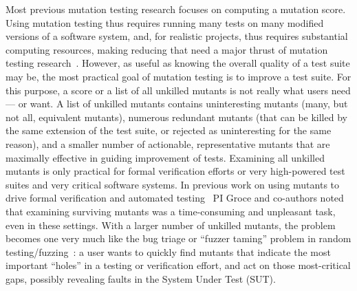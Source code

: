 Most previous mutation testing research focuses on computing a mutation score.  Using mutation testing thus requires running many tests on many modified versions of a software system, and, for realistic projects, thus requires substantial computing resources, making reducing that need a major thrust of mutation testing research~\cite{jia2011analysis}.  However, as useful as knowing the overall quality of a test suite may be, the most practical goal of mutation testing is to improve a test suite.  For this purpose, a score or a list of all unkilled mutants is not really what users need --- or want.  A list of unkilled mutants contains uninteresting mutants (many, but not all, equivalent mutants), numerous redundant mutants (that can be killed by the same extension of the test suite, or rejected as uninteresting for the same reason), and a smaller number of actionable, representative mutants that are maximally effective in guiding improvement of tests.  Examining all unkilled mutants is only practical for formal verification efforts or very high-powered test suites and very critical software systems.  In previous work on using mutants to drive formal verification and automated testing~\cite{groce2015verified,groce2018verified,mutKernel} PI Groce and co-authors noted that examining surviving mutants was a time-consuming and unpleasant task, even in these settings.  With a larger number of unkilled mutants, the problem becomes one very much like the bug triage or ``fuzzer taming'' problem in random testing/fuzzing~\cite{PLDI13,SemCrash}:  a user wants to quickly find mutants that indicate the most important ``holes'' in a testing or verification effort, and act on those most-critical gaps, possibly revealing faults in the System Under Test (SUT).

